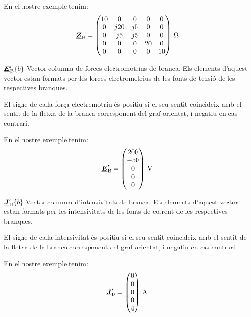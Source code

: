 \begin{list}{}
   En el nostre exemple tenim:
   \[
      \mcmplx{Z}\ped{B} = \begin{pmatrix}
            10 & 0 & 0 & 0 & 0 \\
            0 & j 20 & j 5 & 0 & 0 \\
            0 & j 5 & j 5 & 0 & 0 \\
            0 & 0 & 0 & 20 & 0 \\
            0 & 0 & 0 & 0 & 10
      \end{pmatrix}\unit{\,\ohm}
   \]

   \item[$\underline{\boldsymbol{E}}'_\mathrm{B}\{b\}$] Vector columna de forces electromotrius de branca. Els elements d'aquest vector estan formats per les forces electromotrius de les fonts de tensió de les respectives branques.

El signe de cada força electromotriu és positiu si el seu sentit coincideix amb el sentit de la fletxa de la branca corresponent del graf orientat, i negatiu en cas contrari.

   En el nostre exemple tenim:
   \[
      \mcmplx{E}'\ped{B} = \begin{pmatrix} 200 \\ -50 \\ 0 \\ 0 \\ 0 \end{pmatrix}\unit{\,V}
   \]

   \item[$\underline{\boldsymbol{J}}'_\mathrm{B}\{b\}$] Vector columna d'intensivitats de branca. Els elements d'aquest vector estan formats per les intensivitats de les fonts de corrent de les respectives branques.

El signe de cada intensivitat és positiu si el seu sentit coincideix amb el sentit de la fletxa de la branca corresponent del graf orientat, i negatiu en cas contrari.

   En el nostre exemple tenim:
   \[
      \mcmplx{J}'\ped{B} = \begin{pmatrix} 0 \\ 0 \\ 0 \\ 0 \\ 4 \end{pmatrix}\unit{\,A}
   \]

\end{list}

